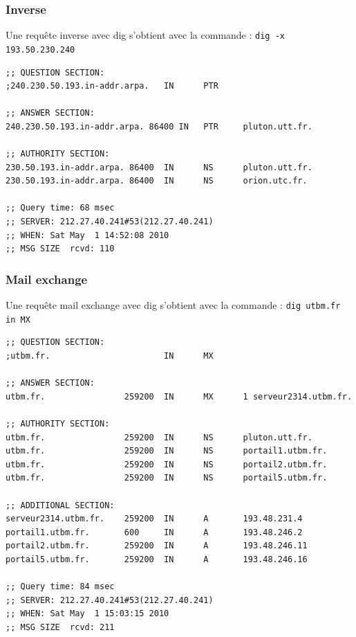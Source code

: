 \documentclass[12pt,a4paper,notitlepage]{article}
\begin{document}
\subsubsection{Inverse}
Une requête inverse avec dig s'obtient avec la commande : \texttt{dig -x 193.50.230.240}\\
\begin{lstlisting}[title=Contenu d'une requête inverse]
;; QUESTION SECTION:
;240.230.50.193.in-addr.arpa.   IN      PTR

;; ANSWER SECTION:
240.230.50.193.in-addr.arpa. 86400 IN   PTR     pluton.utt.fr.

;; AUTHORITY SECTION:
230.50.193.in-addr.arpa. 86400  IN      NS      pluton.utt.fr.
230.50.193.in-addr.arpa. 86400  IN      NS      orion.utc.fr.

;; Query time: 68 msec
;; SERVER: 212.27.40.241#53(212.27.40.241)
;; WHEN: Sat May  1 14:52:08 2010
;; MSG SIZE  rcvd: 110
\end{lstlisting}

\subsubsection{Mail exchange}
Une requête mail exchange avec dig s'obtient avec la commande : \texttt{dig utbm.fr in MX}\\
\begin{lstlisting}[title=Contenu d'une requête de type Exchange Mail]
;; QUESTION SECTION:
;utbm.fr.                       IN      MX

;; ANSWER SECTION:
utbm.fr.                259200  IN      MX      1 serveur2314.utbm.fr.

;; AUTHORITY SECTION:
utbm.fr.                259200  IN      NS      pluton.utt.fr.
utbm.fr.                259200  IN      NS      portail1.utbm.fr.
utbm.fr.                259200  IN      NS      portail2.utbm.fr.
utbm.fr.                259200  IN      NS      portail5.utbm.fr.

;; ADDITIONAL SECTION:
serveur2314.utbm.fr.    259200  IN      A       193.48.231.4
portail1.utbm.fr.       600     IN      A       193.48.246.2
portail2.utbm.fr.       259200  IN      A       193.48.246.11
portail5.utbm.fr.       259200  IN      A       193.48.246.16

;; Query time: 84 msec
;; SERVER: 212.27.40.241#53(212.27.40.241)
;; WHEN: Sat May  1 15:03:15 2010
;; MSG SIZE  rcvd: 211
\end{lstlisting}


\clearpage
\end{document}
